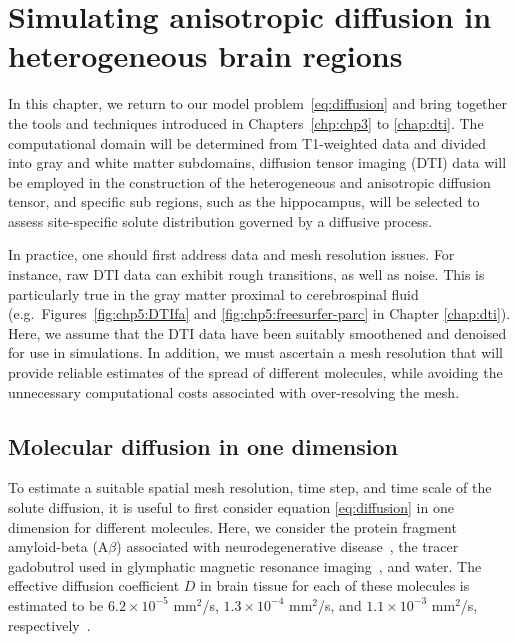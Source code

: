 \chapter{Simulating anisotropic diffusion in heterogeneous brain regions}
\label{chp:chp6}

In this chapter, we return to our model problem~\eqref{eq:diffusion}
and bring together the tools and techniques introduced in
Chapters~\ref{chp:chp3} to \ref{chap:dti}. The computational domain
will be determined from T1-weighted data and divided into gray and
white matter subdomains, diffusion tensor imaging (DTI) data will be
employed in the construction of the heterogeneous and anisotropic
diffusion tensor, and specific sub regions, such as the hippocampus,
will be selected to assess site-specific solute distribution governed
by a diffusive process.

In practice, one should first address data and mesh resolution
issues. For instance, raw DTI data can exhibit rough transitions, as
well as noise. This is particularly true in the gray matter proximal
to cerebrospinal fluid (e.g.~Figures~\ref{fig:chp5:DTIfa} and
\ref{fig:chp5:freesurfer-parc} in Chapter \ref{chap:dti}). Here, we
assume that the DTI data have been suitably smoothened and denoised
for use in simulations. In addition, we must ascertain a mesh
resolution that will provide reliable estimates of the spread of
different molecules, while avoiding the unnecessary computational
costs associated with over-resolving the mesh.

\section{Molecular diffusion in one dimension}
\label{sec:chp6:1D-tests}

To estimate a suitable spatial mesh resolution, time step, and time scale of the solute diffusion, it is useful to
first consider equation \eqref{eq:diffusion} in one dimension for different
molecules. Here, we consider the protein fragment amyloid-beta
(A$\beta$) associated with neurodegenerative
disease~\cite{iliff2012paravascular}, the tracer gadobutrol used in
glymphatic magnetic resonance imaging~\cite{ringstad2018brain}, and water. The
effective diffusion coefficient $D$ in brain tissue for each of these
molecules is estimated to be $6.2 \times 10^{-5}$ mm$^2$/s,
$1.3 \times 10^{-4}$ mm$^2$/s, and $1.1 \times 10^{-3}$ mm$^2$/s,
respectively~\cite{waters2010concentration,valnes2020apparent}.

